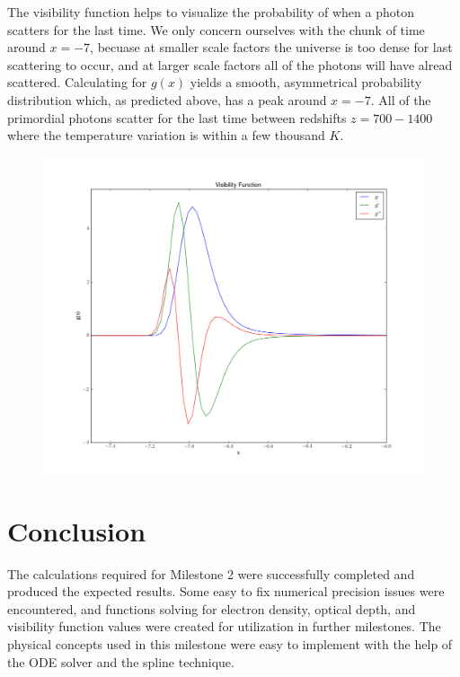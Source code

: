 \documentclass[twoside]{article}
\begin{document}
\clearpage

The visibility function helps to visualize the probability of when a photon scatters for the last time. We only concern ourselves with the chunk of time around $x=-7$, becuase at smaller scale factors the universe is too dense for last scattering to occur, and at larger scale factors all of the photons will have alread scattered. Calculating for $g(x)$ yields a smooth, asymmetrical probability distribution which, as predicted above, has a peak around $x=-7$. All of the primordial photons scatter for the last time between redshifts $z=700-1400$ where the temperature variation is within a few thousand $K$.

\begin{figure}[ht!]\label{fig:vis}
\includegraphics[scale=0.45]{visibilityfunctions}
\end{figure}


\section{Conclusion}\label{sec:conc}

The calculations required for Milestone 2 were successfully completed and produced the expected results. Some easy to fix numerical precision issues were encountered, and functions solving for electron density, optical depth, and visibility function values were created for utilization in further milestones. The physical concepts used in this milestone were easy to implement with the help of the ODE solver and the spline technique.
\end{document}
